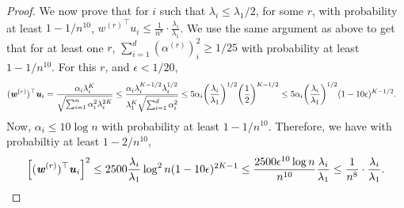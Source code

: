 \documentclass[11pt]{article}
\let\originalleft\left
\let\originalright\right
\renewcommand{\left}{\mathopen{}\mathclose\bgroup\originalleft}
\renewcommand{\right}{\aftergroup\egroup\originalright}
\newcommand\uu{\boldsymbol{\mathit{u}}}
\newcommand\ww{\boldsymbol{\mathit{w}}}
\begin{document}
\begin{proof}
We now prove that for $i$ such that $\lambda_i \leq \lambda_1/2$, for some $r$, with probability at least $1-1/n^{10}$, ${\ww^{(r)}}^{\top}\uu_i \leq \frac{1}{n^8}\cdot \frac{\lambda_i}{\lambda_1}$. We use the same argument as above to get that for at least one $r$, $\sum_{i=1}^d(\alpha^{(r)})_i^2 \geq 1/25$ with probability at least $1-1/n^{10}$. For this $r$, and $\epsilon<1/20$,
\begin{align*}
(\ww^{(r)})^{\top}\uu_i & = \frac{\alpha_i\lambda_i^K}{\sqrt{\sum_{i=1}^n\alpha_i^2\lambda_i^{2K}}} \leq  \frac{\alpha_i\lambda_i^{K-1/2}\lambda_i^{1/2}}{\lambda_1^K\sqrt{\sum_{i=1}^d\alpha_i^2}}\leq 5\alpha_i \left(\frac{\lambda_i}{\lambda_1}\right)^{1/2}\left(\frac{1}{2}\right)^{K-1/2} \leq 5\alpha_i \left(\frac{\lambda_i}{\lambda_1}\right)^{1/2}(1-10\epsilon)^{K-1/2}.
\end{align*}
Now, $\alpha_i\leq 10\log n$ with probability at least $1-1/n^{10}$. Therefore, we have with probabiltiy at least $1-2/n^{10}$,
\[
\left[(\ww^{(r)})^{\top}\uu_i\right]^2 \leq 2500\frac{\lambda_i}{\lambda_1} \log^2 n (1-10\epsilon)^{2K-1} \leq \frac{2500 \epsilon^{10}\log n}{n^{10}}\frac{\lambda_i}{\lambda_1} \leq \frac{1}{n^8} \cdot \frac{\lambda_i}{\lambda_1}.
\]
\end{proof}

         
\end{document}
